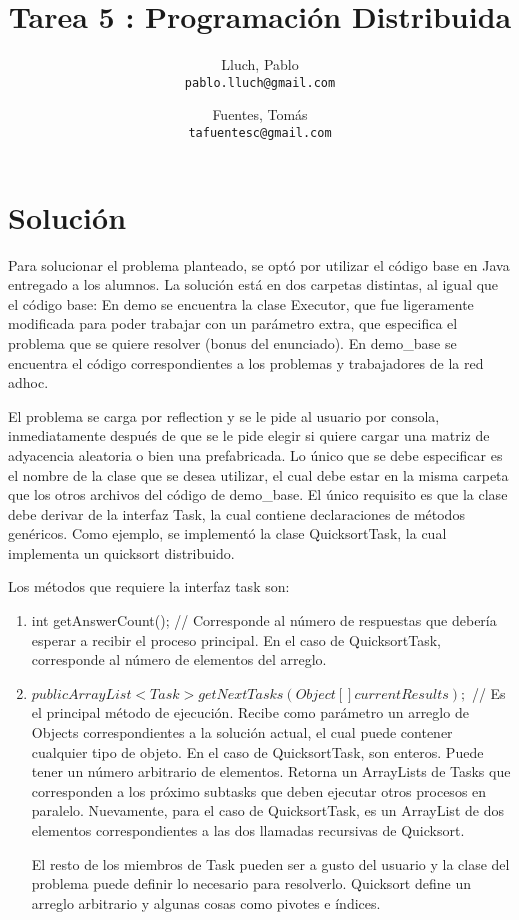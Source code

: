 \documentclass[12pt,spanish]{article}
\author{
  Lluch, Pablo\\
  \texttt{pablo.lluch@gmail.com}
  \and
  Fuentes, Tomás\\
  \texttt{tafuentesc@gmail.com}
}
\title{Tarea 5 : Programación Distribuida}
\begin{document}
	\maketitle
	\newpage
	\section{Solución}

	Para solucionar el problema planteado, se optó por utilizar el código base en Java entregado a los alumnos. La solución está en dos carpetas distintas, al igual que el código base: En demo se encuentra la clase Executor, que fue ligeramente modificada para poder trabajar con un parámetro extra, que especifica el problema que se quiere resolver (bonus del enunciado). En demo\_base se encuentra el código correspondientes a los problemas y trabajadores de la red adhoc.

	El problema se carga por reflection y se le pide al usuario por consola, inmediatamente después de que se le pide elegir si quiere cargar una matriz de adyacencia aleatoria o bien una prefabricada. Lo único que se debe especificar es el nombre de la clase que se desea utilizar, el cual debe estar en la misma carpeta que los otros archivos del código de demo\_base. El único requisito es que la clase debe derivar de la interfaz Task, la cual contiene declaraciones de métodos genéricos. Como ejemplo, se implementó la clase QuicksortTask, la cual implementa un quicksort distribuido.

	Los métodos que requiere la interfaz task son:

	\begin{enumerate}
		\item int getAnswerCount(); // Corresponde al número de respuestas que debería esperar a recibir el proceso principal. En el caso de QuicksortTask, corresponde al número de elementos del arreglo.
		\item $public ArrayList<Task> getNextTasks(Object[] currentResults);$ // Es el principal método de ejecución. Recibe como parámetro un arreglo de Objects correspondientes a la solución actual, el cual puede contener cualquier tipo de objeto. En el caso de QuicksortTask, son enteros. Puede tener un número arbitrario de elementos. 
		Retorna un ArrayLists de Tasks que corresponden a los próximo subtasks que deben ejecutar otros procesos en paralelo. Nuevamente, para el caso de QuicksortTask, es un ArrayList de dos elementos correspondientes a las dos llamadas recursivas de Quicksort. 

		El resto de los miembros de Task pueden ser a gusto del usuario y la clase del problema puede definir lo necesario para resolverlo. Quicksort define un arreglo arbitrario y algunas cosas como pivotes e índices.
	\end{enumerate}
\end{document}
